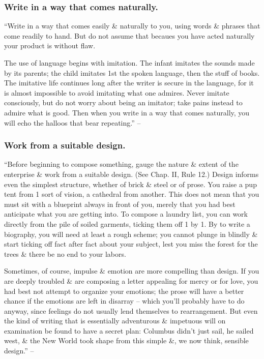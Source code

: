 \documentclass{article}
\begin{document}

\subsubsection{Write in a way that comes naturally.}
``Write in a way that comes easily \& naturally to you, using words \& phrases that come readily to hand. But do not assume that becaues you have acted naturally your product is without flaw.

The use of language begins with imitation. The infant imitates the sounds made by its parents; the child imitates 1st the spoken language, then the stuff of books. The imitative life continues long after the writer is secure in the language, for it is almost impossible to avoid imitating what one admires. Never imitate consciously, but do not worry about being an imitator; take pains instead to admire what is good. Then when you write in a way that comes naturally, you will echo the halloos that bear repeating.'' -- \cite[p. 79]{Strunk_White_element_style}


\subsubsection{Work from a suitable design.}
``Before beginning to compose something, gauge the nature \& extent of the enterprise \& work from a suitable design. (See Chap. II, Rule 12.) Design informs even the simplest structure, whether of brick \& steel or of prose. You raise a pup tent from 1 sort of vision, a cathedral from another. This does not mean that you must sit with a blueprint always in front of you, merely that you had best anticipate what you are getting into. To compose a laundry list, you can work directly from the pile of soiled garments, ticking them off 1 by 1. By to write a biography, you will need at least a rough scheme; you cannot plunge in blindly \& start ticking off fact after fact about your subject, lest you miss the forest for the trees \& there be no end to your labors.

Sometimes, of course, impulse \& emotion are more compelling than design. If you are deeply troubled \& are composing a letter appealing for mercy or for love, you had best not attempt to organize your emotions; the prose will have a better chance if the emotions are left in disarray -- which you'll probably have to do anyway, since feelings do not usually lend themselves to rearrangement. But even the kind of writing that is essentially adventurous \& impetuous will on examination be found to have a secret plan: Columbus didn't just sail, he sailed west, \& the New World took shape from this simple \&, we now think, sensible design.'' -- \cite[p. 80]{Strunk_White_element_style}
\end{document}
